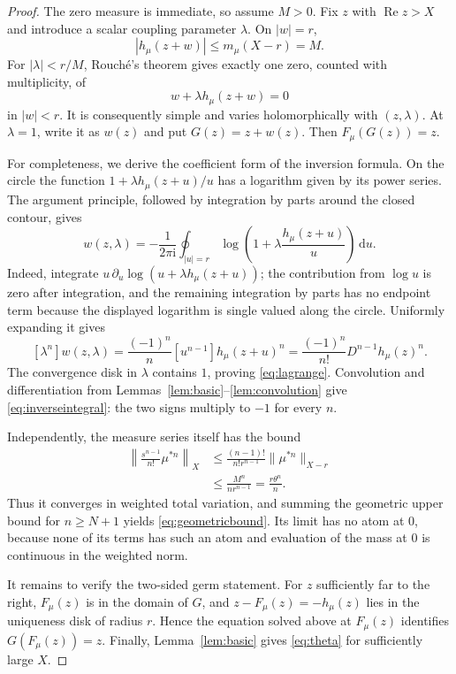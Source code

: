 \documentclass[11pt,a4paper]{article}
\theoremstyle{definition}
\theoremstyle{remark}
\newcommand{\dd}{\,\mathrm d}
\newcommand{\ii}{\mathrm i}
\newcommand{\Rea}{\operatorname{Re}}
\newcommand{\normx}[2]{\lVert #1\rVert_{#2}}
\numberwithin{equation}{section}
\begin{document}
\begin{proof}
The zero measure is immediate, so assume $M>0$. Fix $z$ with $\Rea z>X$ and introduce a scalar coupling parameter $\lambda$. On $|w|=r$,
\[
 |h_\mu(z+w)|\le m_\mu(X-r)=M.
\]
For $|\lambda|<r/M$, Rouch\'e's theorem gives exactly one zero, counted with multiplicity, of
\[
 w+\lambda h_\mu(z+w)=0
\]
in $|w|<r$. It is consequently simple and varies holomorphically with $(z,\lambda)$. At $\lambda=1$, write it as $w(z)$ and put $G(z)=z+w(z)$. Then $F_\mu(G(z))=z$.

For completeness, we derive the coefficient form of the inversion formula. On the circle the function $1+\lambda h_\mu(z+u)/u$ has a logarithm given by its power series. The argument principle, followed by integration by parts around the closed contour, gives
\[
 w(z,\lambda)=-\frac1{2\pi\ii}\oint_{|u|=r}
       \log\left(1+\lambda\frac{h_\mu(z+u)}u\right)\dd u.
\]
Indeed, integrate $u\,\partial_u\log(u+\lambda h_\mu(z+u))$; the contribution from $\log u$ is zero after integration, and the remaining integration by parts has no endpoint term because the displayed logarithm is single valued along the circle. Uniformly expanding it gives
\[
 [\lambda^n]w(z,\lambda)
 =\frac{(-1)^n}{n}[u^{n-1}]h_\mu(z+u)^n
 =\frac{(-1)^n}{n!}D^{n-1}h_\mu(z)^n.
\]
The convergence disk in $\lambda$ contains $1$, proving \eqref{eq:lagrange}. Convolution and differentiation from Lemmas~\ref{lem:basic}--\ref{lem:convolution} give \eqref{eq:inverseintegral}: the two signs multiply to $-1$ for every $n$.

Independently, the measure series itself has the bound
\begin{align*}
 \left\|\frac{s^{n-1}}{n!}\mu^{*n}\right\|_X
 &\le\frac{(n-1)!}{n!r^{n-1}}
       \normx{\mu^{*n}}{X-r}\\
 &\le \frac{M^n}{nr^{n-1}}=\frac{r\theta^n}{n}.
\end{align*}
Thus it converges in weighted total variation, and summing the geometric upper bound for $n\ge N+1$ yields \eqref{eq:geometricbound}. Its limit has no atom at $0$, because none of its terms has such an atom and evaluation of the mass at $0$ is continuous in the weighted norm.

It remains to verify the two-sided germ statement. For $z$ sufficiently far to the right, $F_\mu(z)$ is in the domain of $G$, and $z-F_\mu(z)=-h_\mu(z)$ lies in the uniqueness disk of radius $r$. Hence the equation solved above at $F_\mu(z)$ identifies $G(F_\mu(z))=z$. Finally, Lemma~\ref{lem:basic} gives \eqref{eq:theta} for sufficiently large $X$.
\end{proof}
\end{document}
